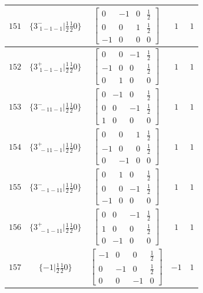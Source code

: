 \documentclass[fleqn,8pt]{jsarticle}
\begin{document}
\begin{longtable}{ccccc}
$ 151 $ & $ \{3^{-}_{\,\,1-1-1}|\frac{1}{2} \frac{1}{2} 0\} $ & $ \begin{bmatrix} 0 & -1 & 0 & \frac{1}{2} \\ 0 & 0 & 1 & \frac{1}{2} \\ -1 & 0 & 0 & 0 \end{bmatrix} $ & $ 1 $ & $ 1 $ \\ \hline
$ 152 $ & $ \{3^{+}_{\,\,1-1-1}|\frac{1}{2} \frac{1}{2} 0\} $ & $ \begin{bmatrix} 0 & 0 & -1 & \frac{1}{2} \\ -1 & 0 & 0 & \frac{1}{2} \\ 0 & 1 & 0 & 0 \end{bmatrix} $ & $ 1 $ & $ 1 $ \\ \hline
$ 153 $ & $ \{3^{-}_{\,\,-11-1}|\frac{1}{2} \frac{1}{2} 0\} $ & $ \begin{bmatrix} 0 & -1 & 0 & \frac{1}{2} \\ 0 & 0 & -1 & \frac{1}{2} \\ 1 & 0 & 0 & 0 \end{bmatrix} $ & $ 1 $ & $ 1 $ \\ \hline
$ 154 $ & $ \{3^{+}_{\,\,-11-1}|\frac{1}{2} \frac{1}{2} 0\} $ & $ \begin{bmatrix} 0 & 0 & 1 & \frac{1}{2} \\ -1 & 0 & 0 & \frac{1}{2} \\ 0 & -1 & 0 & 0 \end{bmatrix} $ & $ 1 $ & $ 1 $ \\ \hline
$ 155 $ & $ \{3^{-}_{\,\,-1-11}|\frac{1}{2} \frac{1}{2} 0\} $ & $ \begin{bmatrix} 0 & 1 & 0 & \frac{1}{2} \\ 0 & 0 & -1 & \frac{1}{2} \\ -1 & 0 & 0 & 0 \end{bmatrix} $ & $ 1 $ & $ 1 $ \\ \hline
$ 156 $ & $ \{3^{+}_{\,\,-1-11}|\frac{1}{2} \frac{1}{2} 0\} $ & $ \begin{bmatrix} 0 & 0 & -1 & \frac{1}{2} \\ 1 & 0 & 0 & \frac{1}{2} \\ 0 & -1 & 0 & 0 \end{bmatrix} $ & $ 1 $ & $ 1 $ \\ \hline
$ 157 $ & $ \{-1|\frac{1}{2} \frac{1}{2} 0\} $ & $ \begin{bmatrix} -1 & 0 & 0 & \frac{1}{2} \\ 0 & -1 & 0 & \frac{1}{2} \\ 0 & 0 & -1 & 0 \end{bmatrix} $ & $ -1 $ & $ 1 $ \\ \hline

\end{longtable}
\end{document}
